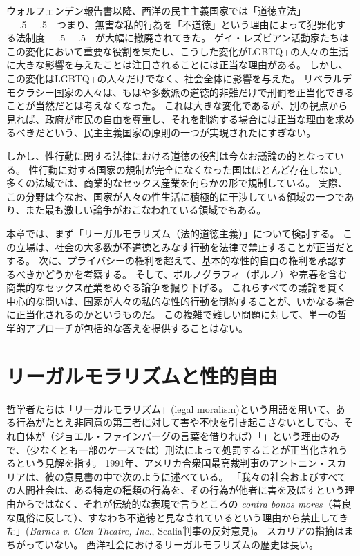 \documentclass[paper=a4,book,openany]{jlreq}
\def\DDASH{―\kern-.5\zw―\kern-.5\zw―}
\begin{document}
ウォルフェンデン報告書以降、西洋の民主主義国家では「道徳立法」{\DDASH}つまり、無害な私的行為を「不道徳」という理由によって犯罪化する法制度{\DDASH}が大幅に撤廃されてきた。
ゲイ・レズビアン活動家たちはこの変化において重要な役割を果たし、こうした変化がLGBTQ+の人々の生活に大きな影響を与えたことは注目されることには正当な理由がある。
しかし、この変化はLGBTQ+の人々だけでなく、社会全体に影響を与えた。
リベラルデモクラシー国家の人々は、もはや多数派の道徳的非難だけで刑罰を正当化できることが当然だとは考えなくなった。
これは大きな変化であるが、別の視点から見れば、政府が市民の自由を尊重し、それを制約する場合には正当な理由を求めるべきだという、民主主義国家の原則の一つが実現されたにすぎない。

しかし、性行動に関する法律における道徳の役割は今なお議論の的となっている。
性行動に対する国家の規制が完全になくなった国はほとんど存在しない。
多くの法域では、商業的なセックス産業を何らかの形で規制している。
実際、この分野は今なお、国家が人々の性生活に積極的に干渉している領域の一つであり、また最も激しい論争がおこなわれている領域でもある。

本章では、まず「リーガルモラリズム（法的道徳主義）」について検討する。
この立場は、社会の大多数が不道徳とみなす行動を法律で禁止することが正当だとする。
次に、プライバシーの権利を超えて、基本的な性的自由の権利を承認するべきかどうかを考察する。
そして、ポルノグラフィ（ポルノ）や売春を含む商業的なセックス産業をめぐる論争を掘り下げる。
これらすべての議論を貫く中心的な問いは、国家が人々の私的な性的行動を制約することが、いかなる場合に正当化されるのかというものだ。
この複雑で難しい問題に対して、単一の哲学的アプローチが包括的な答えを提供することはない。

\section{リーガルモラリズムと性的自由}

哲学者たちは「リーガルモラリズム」(legal moralism)という用語を用いて、ある行為がたとえ非同意の第三者に対して害や不快を引き起こさないとしても、それ自体が（ジョエル・ファインバーグの言葉を借りれば）「」という理由のみで、（少なくとも一部のケースでは）刑法によって処罰することが正当化されうるという見解を指す\citep[p.249]{feinberg87:_some_unswep_debris_hart_devlin_debat}。
1991年、アメリカ合衆国最高裁判事のアントニン・スカリアは、彼の意見書の中で次のように述べている。
「我々の社会およびすべての人間社会は、ある特定の種類の行為を、その行為が他者に害を及ぼすという理由からではなく、それが伝統的な表現で言うところの \emph{contra bonos mores}（善良な風俗に反して）、すなわち不道徳と見なされているという理由から禁止してきた」(\emph{Barnes v. Glen Theatre, Inc.}, Scalia判事の反対意見)。
スカリアの指摘はまちがっていない。
西洋社会におけるリーガルモラリズムの歴史は長い。
\end{document}

